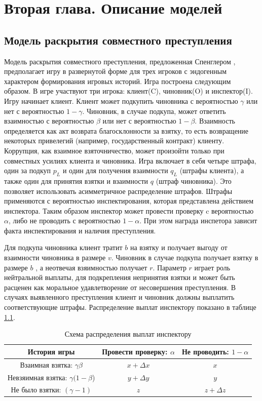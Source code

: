 \chapter{Вторая глава. Описание моделей}
\label{cha:ch_2}
\section{Модель раскрытия совместного преступления}
Модель раскрытия совместного преступления, предложенная Спенглером \cite{Spengler}, предполагает игру в развернутой форме для трех игроков с эндогенным характером формирования игровых историй.
Игра построена следующим образом. В игре участвуют три игрока: клиент(C), чиновник(O) и инспектор(I). Игру начинает клиент. Клиент может подкупить чиновника с вероятностью $\gamma$ или нет с вероятностью $1 - \gamma$. Чиновник, в случае подкупа, может ответить взаимностью с вероятностью $\beta$ или нет с вероятностью $1 - \beta$. Взаимность определяется как акт возврата благосклонности за взятку, то есть возвращение некоторых привелегий (например, государственный контракт) клиенту. Коррупция, как взаимное взяточничество, может произойти только при совместных усилиях клиента и чиновника. Игра включает в себя четыре штрафа, один за подкуп $p_L$ и один для получения взаимности $q_L$ (штрафы клиента), а также один для принятия взятки и взаимности $q$ (штраф чиновника). Это позволяет использовать асимметричное распределение штрафов. Штрафы применяются с вероятностью инспектирования, которая представлена действием инспектора. Таким образом инспектор может провести проверку c вероятностью $\alpha$, либо не проводить с вероятностью $1 - \alpha$. При этом награда инспетора зависит факта инспектирования и наличия преступления. 
\par 
Для подкупа чиновника клиент тратит $b$ на взятку и получает выгоду от взаимности чиновника в размере $v$. Чиновник в случае подкупа получает взятку в размере $b$ , а неотвечая взяимностью получает $r$. Параметр $r$ играет роль нейтральной выплаты, для подкрепления непринятия взятки и может быть расценен как моральное удавлетворение от несовершения преступления. В случаях выявленного преступления клиент и чиновник должны выплатить соответствующие штрафы. 
Распределение выплат инспектору показано в таблице \ref{tbl:inspr1}.
\begin{table}[H]
	\centering
	\begin{tabular}[t]{|c|c|c|}
		\hline
		История игры & Провести проверку: $\alpha$ & Не проводить: $1-\alpha$ \\
		\hline
		Взаимная взятка: $\gamma \beta$ & $x + \Delta x$ & $x$ \\
		\hline
		Невзяимная взятка: $\gamma (1 - \beta$) &  $y + \Delta y$ & $y$ \\
		\hline
		Не было взятки: $(\gamma - 1)$ &  $z$ & $z + \Delta z$ \\
		\hline
	\end{tabular}
	\caption{\centering Схема распределения выплат инспектору}
	\label{tbl:inspr1}
\end{table}
